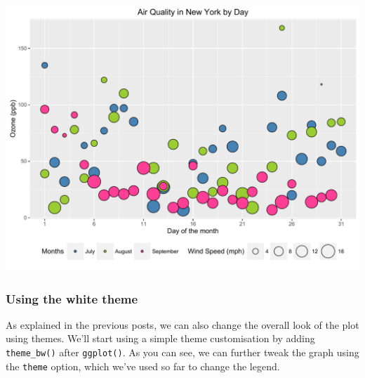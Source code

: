 \documentclass[]{article}
\begin{document}
\begin{center}\includegraphics{0_all_posts_pdf/wscatter_16-1} \end{center}

\subsubsection{Using the white theme}\label{using-the-white-theme-5}

As explained in the previous posts, we can also change the overall look
of the plot using themes. We'll start using a simple theme customisation
by adding \texttt{theme\_bw()} after \texttt{ggplot()}. As you can see,
we can further tweak the graph using the \texttt{theme} option, which
we've used so far to change the legend.
\end{document}
